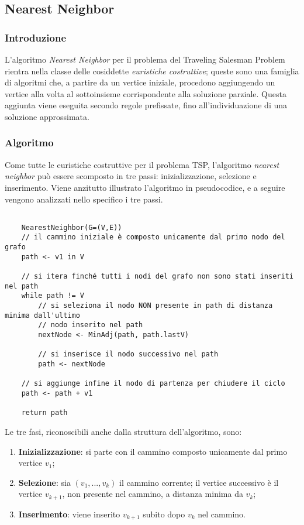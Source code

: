 \subsection{Nearest Neighbor}

\subsubsection{Introduzione}

L'algoritmo \textit{Nearest Neighbor} per il problema del Traveling Salesman Problem rientra nella classe delle cosiddette \textit{euristiche costruttive}; queste sono una famiglia di algoritmi che, a partire da un vertice iniziale, procedono aggiungendo un vertice alla volta al sottoinsieme corrispondente alla soluzione parziale. Questa aggiunta viene eseguita secondo regole prefissate, fino all'individuazione di una soluzione approssimata.

\subsubsection{Algoritmo}

Come tutte le euristiche costruttive per il problema TSP, l'algoritmo \textit{nearest neighbor} può essere scomposto in tre passi: inizializzazione, selezione e inserimento. Viene anzitutto illustrato l'algoritmo in pseudocodice, e a seguire vengono analizzati nello specifico i tre passi.

\begin{verbatim}

    NearestNeighbor(G=(V,E))
    // il cammino iniziale è composto unicamente dal primo nodo del grafo
    path <- v1 in V

    // si itera finché tutti i nodi del grafo non sono stati inseriti nel path
    while path != V 
        // si seleziona il nodo NON presente in path di distanza minima dall'ultimo
        // nodo inserito nel path
        nextNode <- MinAdj(path, path.lastV)

        // si inserisce il nodo successivo nel path
        path <- nextNode
    
    // si aggiunge infine il nodo di partenza per chiudere il ciclo
    path <- path + v1

    return path
\end{verbatim}

Le tre fasi, riconoscibili anche dalla struttura dell'algoritmo, sono:
\begin{enumerate}
    \item \textbf{Inizializzazione}: si parte con il cammino composto unicamente dal primo vertice $v_1$;
    \item \textbf{Selezione}: sia $(v_1,...,v_k)$ il cammino corrente; il vertice successivo è il vertice $v_{k+1}$, non presente nel cammino, a distanza minima da $v_k$;
    \item \textbf{Inserimento}: viene inserito $v_{k+1}$ subito dopo $v_k$ nel cammino.
\end{enumerate}

